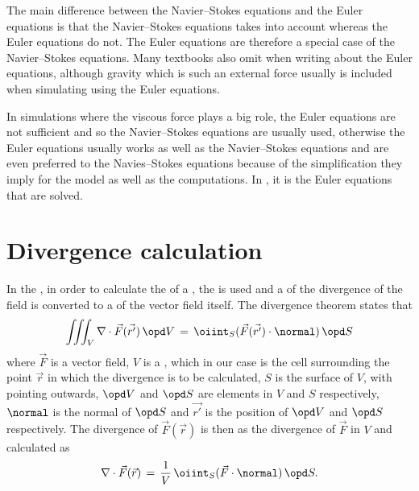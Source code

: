 The main difference between the Navier--Stokes equations and the Euler equations is that the Navier--Stokes equations takes  into account whe\-reas the Euler equations do not. The Euler equations are therefore a special case of the Navier--Stokes equations. Many textbooks also omit  when writing about the Euler equations, although gravity which is such an external force usually is included when simulating  using the Euler equations.

In simulations where the viscous force plays a big role, the Euler equations are not sufficient and so the Navier--Stokes equations are usually used, otherwise the Euler equations usually works as well as the Navier--Stokes equations and are even preferred to the Navies--Stokes equations because of the simplification they imply for the model as well as the computations. In \thisprojectwork, it is the Euler equations that are solved.

\section{Divergence calculation}

In the \PDEs, in order to calculate the \divergence of a , the  is used and a  of the divergence of the field is converted to a  of the vector field itself. The divergence theorem states that
%
\begin{equation} \label{eq:divergence_theorem}
\iiint_V\nabla\cdot\vec{F}(\vec{r'})\,\opd V \,=\, \oiint_S(\vec{F}(\vec{r'})\cdot\normal)\,\opd S
\end{equation}
%
where $\vec{F}$ is a vector field, $V$ is a , which in our case is the cell surrounding the point $\vec{r}$ in which the divergence is to be calculated, $S$ is the surface of $V$, with  pointing outwards, $\opd V$ and $\opd S$ are \infinitesimal elements in $V$ and $S$ respectively, $\normal$ is the normal of $\opd S$ and $\vec{r'}$ is the position of $\opd V$ and $\opd S$ respectively. The divergence of $\vec{F}(\vec{r})$ is then \approximated as the \average divergence of $\vec{F}$ in $V$ and calculated as
%
\begin{equation} \label{eq:divergence_surface_integral}
\nabla\cdot\vec{F}(\vec{r}) \,=\, \frac{1}{V}\,\oiint_S(\vec{F}\cdot\normal)\,\opd S.
\end{equation}

